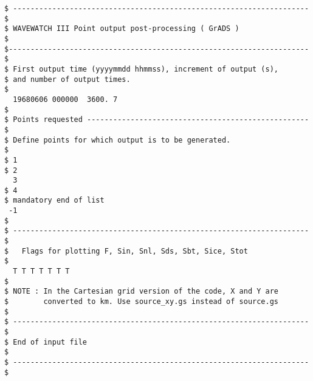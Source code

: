 \begin{footnotesize}
\begin{verbatim}
$ -------------------------------------------------------------------- $
$ WAVEWATCH III Point output post-processing ( GrADS )                 $
$--------------------------------------------------------------------- $
$ First output time (yyyymmdd hhmmss), increment of output (s), 
$ and number of output times.
$
  19680606 000000  3600. 7
$
$ Points requested --------------------------------------------------- $
$ Define points for which output is to be generated. 
$
$ 1
$ 2
  3
$ 4
$ mandatory end of list
 -1
$
$ -------------------------------------------------------------------- $
$   Flags for plotting F, Sin, Snl, Sds, Sbt, Sice, Stot
$
  T T T T T T T 
$
$ NOTE : In the Cartesian grid version of the code, X and Y are
$        converted to km. Use source_xy.gs instead of source.gs
$
$ -------------------------------------------------------------------- $
$ End of input file                                                    $
$ -------------------------------------------------------------------- $
\end{verbatim}
\end{footnotesize}

